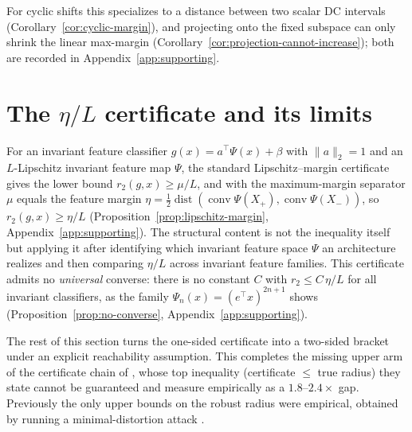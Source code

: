 \documentclass[11pt]{article}
\theoremstyle{plain}
\theoremstyle{definition}
\theoremstyle{remark}
\newcommand{\conv}{\operatorname{conv}}
\newcommand{\dist}{\operatorname{dist}}
\begin{document}
For cyclic shifts this specializes to a distance between two scalar DC intervals (Corollary~\ref{cor:cyclic-margin}), and projecting onto the fixed subspace can only shrink the linear max-margin (Corollary~\ref{cor:projection-cannot-increase}); both are recorded in Appendix~\ref{app:supporting}.

\section{The $\eta/L$ certificate and its limits}\label{sec:etaL}

For an invariant feature classifier $g(x)=a^\top\Psi(x)+\beta$ with $\|a\|_2=1$ and an $L$-Lipschitz invariant feature map $\Psi$, the standard Lipschitz--margin certificate gives the lower bound $r_2(g,x)\ge\mu/L$, and with the maximum-margin separator $\mu$ equals the feature margin $\eta=\tfrac12\dist(\conv\Psi(X_+),\conv\Psi(X_-))$, so $r_2(g,x)\ge\eta/L$ (Proposition~\ref{prop:lipschitz-margin}, Appendix~\ref{app:supporting}).  The structural content is not the inequality itself but applying it after identifying which invariant feature space $\Psi$ an architecture realizes and then comparing $\eta/L$ across invariant feature families.  This certificate admits no \emph{universal} converse: there is no constant $C$ with $r_2\le C\,\eta/L$ for all invariant classifiers, as the family $\Psi_n(x)=(e^\top x)^{2n+1}$ shows (Proposition~\ref{prop:no-converse}, Appendix~\ref{app:supporting}).

The rest of this section turns the one-sided certificate into a two-sided bracket under an explicit reachability assumption.  This completes the missing upper arm of the certificate chain of \citet[Eq.~5]{Tsuzuku2018}, whose top inequality (certificate $\le$ true radius) they state cannot be guaranteed and measure empirically as a $1.8$--$2.4\times$ gap.  Previously the only upper bounds on the robust radius were empirical, obtained by running a minimal-distortion attack \citep{CroceHeinFAB2020}.
\end{document}
